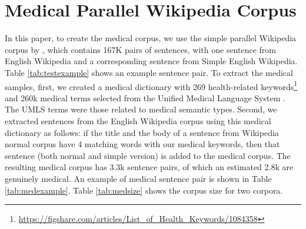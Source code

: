 \documentclass[11pt]{article}
\begin{document}
\section{Medical Parallel Wikipedia Corpus}

In this paper, to create the medical corpus, we use the simple parallel Wikipedia corpus by \cite{kauchak2013improving}, which contains 167K pairs of sentences, with one sentence from English Wikipedia and a corresponding sentence from Simple English Wikipedia. Table \ref{tab:testexample} shows an example sentence pair. To extract the medical samples, first, we created a medical dictionary with 269 health-related keywords\footnote{\url{https://figshare.com/articles/List_of_Health_Keywords/1084358}} and 260k medical terms selected from the Unified Medical Language System \cite{bodenreider2004unified}. The UMLS terms were those related to medical semantic types. Second, we extracted sentences from the English Wikipedia corpus using this medical dictionary as follows: if the title and the body of a sentence from Wikipedia normal corpus have 4 matching words with our medical keywords, then that sentence (both normal and simple version) is added to the medical corpus. The resulting medical corpus has 3.3k sentence pairs, of which an estimated 2.8k are genuinely medical. An example of medical sentence pair is shown in Table \ref{tab:medexample}. Table \ref{tab:medsize} shows the corpus size for two corpora. 

\begin{table}
    \centering
    \caption{An example of sentence pair in Medical Wikipedia parallel corpus.}
    \label{tab:medexample}
\end{table}
\end{document}
